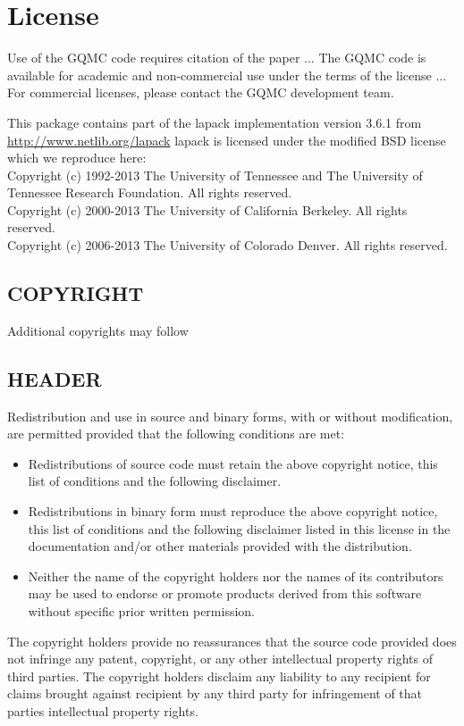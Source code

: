 \section{License}
Use of the GQMC code requires citation of the paper ...
The GQMC code is available for academic and non-commercial use under the terms of the license ...
For commercial licenses, please contact the GQMC development team. 

This package contains part of the lapack implementation version 3.6.1 from \url{http://www.netlib.org/lapack}
lapack is licensed under the modified BSD license which we reproduce here:\\

Copyright (c) 1992-2013 The University of Tennessee and The University
                        of Tennessee Research Foundation.  All rights
                        reserved.\\
Copyright (c) 2000-2013 The University of California Berkeley. All
                        rights reserved.\\
Copyright (c) 2006-2013 The University of Colorado Denver.  All rights
                        reserved.

\subsection*{COPYRIGHT}

Additional copyrights may follow

\subsection*{HEADER}

Redistribution and use in source and binary forms, with or without
modification, are permitted provided that the following conditions are
met:\\

\begin{itemize}

\item Redistributions of source code must retain the above copyright
  notice, this list of conditions and the following disclaimer.

\item Redistributions in binary form must reproduce the above copyright
  notice, this list of conditions and the following disclaimer listed
  in this license in the documentation and/or other materials
  provided with the distribution.

\item Neither the name of the copyright holders nor the names of its
  contributors may be used to endorse or promote products derived from
  this software without specific prior written permission.
\end{itemize}
The copyright holders provide no reassurances that the source code
provided does not infringe any patent, copyright, or any other
intellectual property rights of third parties.  The copyright holders
disclaim any liability to any recipient for claims brought against
recipient by any third party for infringement of that parties
intellectual property rights.\\

